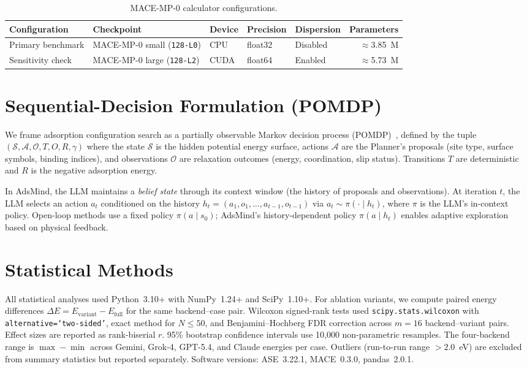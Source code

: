\documentclass[%
 preprint,
 superscriptaddress,
 amsmath,amssymb,
 aps,
 prb,
 floatfix,
]{revtex4-2}
\begin{document}
\begin{table}[ht]
\centering
\caption{MACE-MP-0 calculator configurations.}
\label{tab:mace_config}
\begin{tabular}{lllllr}
\toprule
Configuration & Checkpoint & Device & Precision & Dispersion & Parameters \\
\midrule
Primary benchmark & MACE-MP-0 small (\texttt{128-L0}) & CPU & float32 & Disabled & $\approx$3.85~M \\
Sensitivity check & MACE-MP-0 large  (\texttt{128-L2}) & CUDA & float64 & Enabled  & $\approx$5.73~M \\
\bottomrule
\end{tabular}
\end{table}


\section{Sequential-Decision Formulation (POMDP)}
\label{sec:si-pomdp}

We frame adsorption configuration search as a partially observable Markov decision process (POMDP)~\cite{kochenderfer2015decision,astrom1965optimal,sutton2018reinforcement}, defined by the tuple $(\mathcal{S}, \mathcal{A}, \mathcal{O}, T, O, R, \gamma)$ where the state $\mathcal{S}$ is the hidden potential energy surface, actions $\mathcal{A}$ are the Planner's proposals (site type, surface symbols, binding indices), and observations $\mathcal{O}$ are relaxation outcomes (energy, coordination, slip status). Transitions $T$ are deterministic and $R$ is the negative adsorption energy.

In AdsMind, the LLM maintains a \textit{belief state} through its context window (the history of proposals and observations). At iteration $t$, the LLM selects an action $a_t$ conditioned on the history $h_t = (a_1, o_1, \dots, a_{t-1}, o_{t-1})$ via $a_t \sim \pi(\cdot \mid h_t)$, where $\pi$ is the LLM's in-context policy. Open-loop methods use a fixed policy $\pi(a \mid s_0)$; AdsMind's history-dependent policy $\pi(a \mid h_t)$ enables adaptive exploration based on physical feedback.


\section{Statistical Methods}

All statistical analyses used Python~3.10+ with NumPy~1.24+ and SciPy~1.10+. For ablation variants, we compute paired energy differences $\Delta E = E_{\mathrm{variant}} - E_{\mathrm{full}}$ for the same backend--case pair. Wilcoxon signed-rank tests used \texttt{scipy.stats.wilcoxon} with \texttt{alternative=`two-sided'}, exact method for $N \leq 50$, and Benjamini--Hochberg FDR correction across $m = 16$ backend--variant pairs. Effect sizes are reported as rank-biserial $r$. 95\% bootstrap confidence intervals use 10,000 non-parametric resamples. The four-backend range is $\max - \min$ across Gemini, Grok-4, GPT-5.4, and Claude energies per case. Outliers (run-to-run range $>2.0$~eV) are excluded from summary statistics but reported separately. Software versions: ASE~3.22.1, MACE~0.3.0, pandas~2.0.1.
\end{document}
